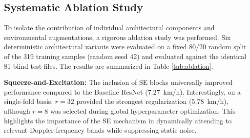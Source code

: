 \documentclass[conference]{IEEEtran}
\begin{document}
\begin{table}[htbp]
\centering
\caption{Systematic Architectural Ablation Study on Test Set (N=81)}
\label{tab:ablation}
\end{table}

\subsection{Systematic Ablation Study}
To isolate the contribution of individual architectural components and environmental augmentations, a rigorous ablation study was performed. Six deterministic architectural variants were evaluated on a fixed $80/20$ random split of the 319 training samples (random seed 42) and evaluated against the identical 81 blind test files. The results are summarized in Table \ref{tab:ablation}.



\textbf{Squeeze-and-Excitation:} The inclusion of SE blocks universally improved performance compared to the Baseline ResNet ($7.27$~km/h). Interestingly, on a single-fold basis, $r=32$ provided the strongest regularization ($5.78$~km/h), although $r=8$ was selected during global hyperparameter optimization. This highlights the importance of the SE mechanism in dynamically attending to relevant Doppler frequency bands while suppressing static noise.
\end{document}
